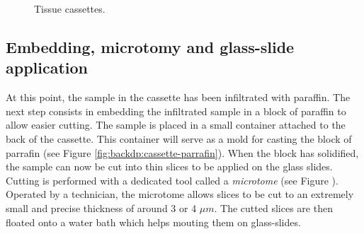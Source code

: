 
  
    

\begin{figure}
  \centering
  \quad
  \caption{Tissue cassettes.}
\end{figure}

\subsection{Embedding, microtomy and glass-slide application}
\label{ssec:backdp:embedding}

At this point, the sample in the cassette has been infiltrated with paraffin. The next step consists in embedding the infiltrated sample in a block of paraffin to allow easier cutting. The sample is placed in a small container attached to the back of the cassette. This container will serve as a mold for casting the block of parrafin (see Figure \ref{fig:backdp:cassette-parrafin}). When the block has solidified, the sample can now be cut into thin slices to be applied on the glass slides. Cutting is performed with a dedicated tool called a \textit{microtome} (see Figure ). Operated by a technician, the microtome allows slices to be cut to an extremely small and precise thickness of around 3 or 4 $\mu m$. The cutted slices are then floated onto a water bath which helps mouting them on glass-slides. 

